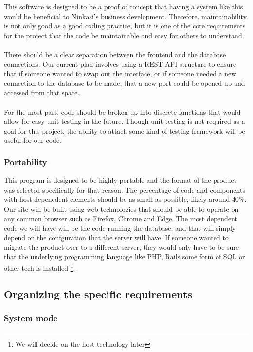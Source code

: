 \documentclass[draftclsnofoot,onecolumn,letterpaper,10pt,compsoc]{IEEEtran}
\begin{document}
		This software is designed to be a proof of concept that having a system like this would be beneficial to Ninkasi's business development.
		Therefore, maintainability is not only good as a good coding practice, but it is one of the core requirements for the project that the code be maintainable and easy for others to understand.
		\\ \\
		There should be a clear separation between the frontend and the database connections.
		Our current plan involves using a REST API structure to ensure that if someone wanted to swap out the interface, or if someone needed a new connection to the database to be made, that a new port could be opened up and accessed from that space.
		\\ \\
		For the most part, code should be broken up into discrete functions that would allow for easy unit testing in the future.
		Though unit testing is not required as a goal for this project, the ability to attach some kind of testing framework will be useful for our code.


		\subsubsection{Portability}

		This program is designed to be highly portable and the format of the product was selected specifically for that reason.
		The percentage of code and components with host-depenedent elements should be as small as possible, likely around 40\%.
		Our site will be built using web technologies that should be able to operate on any common browser such as Firefox, Chrome and Edge.
		The most dependent code we will have will be the code running the database, and that will simply depend on the confguration that the server will have.
		If someone wanted to migrate the product over to a different server, they would only have to be sure that the underlying programming language like PHP, Rails some form of SQL or other tech is installed
		\footnote{We will decide on the host technology later}.

	\subsection{Organizing the specific requirements}
		\subsubsection{System mode}
\end{document}

